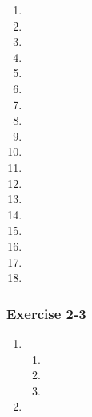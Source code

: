{\begin{multicols}{3}
\begin{enumerate}[noitemsep, label=\textbf{\arabic*}. ] 
\item %
\item %
\item %
\item %
\item %
\item %
\item %
\item %
\item %
\item %
\item %
\item %
\item %
\item %
\item %
\item %
\item %
\item %
\end{enumerate}



\subsubsection*{Exercise 2-3} %
\begin{enumerate}[noitemsep, label=\textbf{\arabic*}. ] 

\item %
\begin{enumerate}[noitemsep, label=\textbf{(\alph*)} ] 
\item %
\item %
\item %
\end{enumerate}

\item %

\begin{enumerate}[noitemsep, label=\textbf{(\alph*)} ] 


\end{enumerate}
\end{enumerate}
\end{multicols}}
